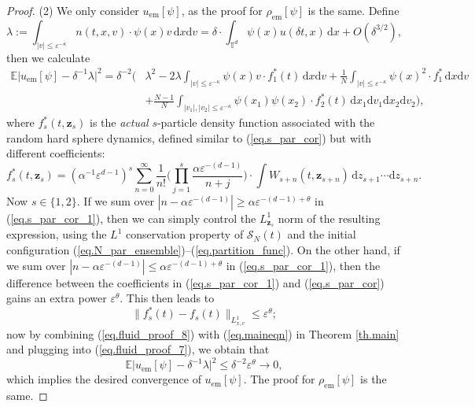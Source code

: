 \documentclass[10pt, reqno]{amsart}
\newcommand{\Eb}{\mathbb E}
\newcommand{\Tb}{\mathbb T}
\newcommand{\Sc}{\mathcal S}
\newcommand{\vz}{\boldsymbol{z}}
\theoremstyle{definition}
\theoremstyle{remark}
\numberwithin{equation}{section}
\begin{document}
\begin{proof}
(2) We only consider $u_{\mathrm{em}}[\psi]$, as the proof for $\rho_{\mathrm{em}}[\psi]$ is the same. Define
\begin{equation}\label{eq.fluid_proof_6}
\lambda:=\int_{|v|\leq \varepsilon^{-\kappa}}n(t,x,v)\cdot\psi(x)v\,\mathrm{d}x\mathrm{d}v=\delta\cdot \int_{\Tb^d}\psi(x)u({\delta t},x)\,\mathrm{d}x+O(\delta^{3/2}),
\end{equation} then we calculate
\begin{equation}\label{eq.fluid_proof_7}
\begin{aligned}
\Eb\big|u_{\mathrm{em}}[\psi]-\delta^{-1}\lambda\big|^2=\delta^{-2}\bigg(&\lambda^2-2\lambda\int_{|v|\leq \varepsilon^{-\kappa}}\psi(x)v\cdot f_1^*(t)\,\mathrm{d}x\mathrm{d}v+\frac{1}{N}\int_{|v|\leq \varepsilon^{-\kappa}}\psi(x)^2\cdot f_1^*\,\mathrm{d}x\mathrm{d}v\\
&+\frac{N-1}{N}\int_{|v_1|,|v_2|\leq\varepsilon^{-\kappa}}\psi(x_1)\psi(x_2)\cdot f_2^*(t)\,\mathrm{d}x_1\mathrm{d}v_1\mathrm{d}x_2\mathrm{d}v_2\bigg),
\end{aligned}
\end{equation} where $f_s^*(t,\vz_s)$ is the \emph{actual} $s$-particle density function associated with the random hard sphere dynamics, defined similar to (\ref{eq.s_par_cor}) but with different coefficients:
\begin{equation}\label{eq.s_par_cor_1}f_s^*(t,\vz_s)=(\alpha^{-1}\varepsilon^{d-1})^s\sum_{n=0}^{\infty}\frac{1}{n!}\bigg(\prod_{j=1}^s\frac{\alpha\varepsilon^{-(d-1)}}{n+j}\bigg)\cdot \int W_{s+n}(t,\vz_{s+n})\,\mathrm{d}z_{s+1}\cdots \mathrm{d}z_{s+n}.
\end{equation} Now $s\in\{1,2\}$. If we sum over $|n-\alpha\varepsilon^{-(d-1)}|\geq \alpha\varepsilon^{-(d-1)+\theta}$ in (\ref{eq.s_par_cor_1}), then we can simply control the $L_{\vz_s}^1$ norm of the resulting expression, using the $L^1$ conservation property of $\Sc_N(t)$ and the initial configuration (\ref{eq.N_par_ensemble})--(\ref{eq.partition_func}). On the other hand, if we sum over $|n-\alpha\varepsilon^{-(d-1)}|\leq \alpha\varepsilon^{-(d-1)+\theta}$ in (\ref{eq.s_par_cor_1}), then the difference between the coefficients in (\ref{eq.s_par_cor_1}) and (\ref{eq.s_par_cor}) gains an extra power $\varepsilon^{\theta}$. This then leads to 
\begin{equation}\label{eq.fluid_proof_8}\|f_s^*(t)-f_s(t)\|_{L_{x,v}^1}\leq \varepsilon^{\theta};
\end{equation} now by combining (\ref{eq.fluid_proof_8}) with (\ref{eq.maineqn}) in Theorem \ref{th.main} and plugging into (\ref{eq.fluid_proof_7}), we obtain that \begin{equation}\label{eq.fluid_proof_9}\Eb\big|u_{\mathrm{em}}[\psi]-\delta^{-1}\lambda\big|^2\leq \delta^{-2}\varepsilon^{\theta}\to 0,\end{equation} which implies the desired convergence of $u_{\mathrm{em}}[\psi]$. The proof for $\rho_{\mathrm{em}}[\psi]$ is the same.
\end{proof}
\end{document}
